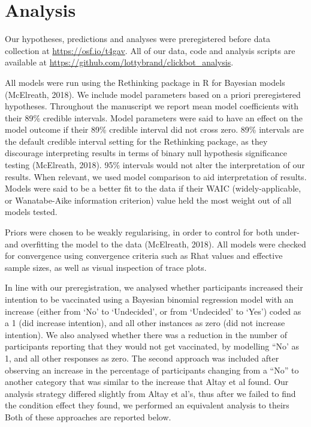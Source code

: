 \documentclass[
  english,
  ,jou,floatsintext]{apa6}
\begin{document}
\hypertarget{analysis}{%
\section{Analysis}\label{analysis}}

Our hypotheses, predictions and analyses were preregistered before data collection at \url{https://osf.io/t4gav}. All of our data, code and analysis scripts are available at \url{https://github.com/lottybrand/clickbot_analysis}.

All models were run using the Rethinking package in R for Bayesian models (McElreath, 2018). We include model parameters based on a priori preregistered hypotheses. Throughout the manuscript we report mean model coefficients with their 89\% credible intervals. Model parameters were said to have an effect on the model outcome if their 89\% credible interval did not cross zero. 89\% intervals are the default credible interval setting for the Rethinking package, as they discourage interpreting results in terms of binary null hypothesis significance testing (McElreath, 2018). 95\% intervals would not alter the interpretation of our results. When relevant, we used model comparison to aid interpretation of results. Models were said to be a better fit to the data if their WAIC (widely-applicable, or Wanatabe-Aike information criterion) value held the most weight out of all models tested.

Priors were chosen to be weakly regularising, in order to control for both under- and overfitting the model to the data (McElreath, 2018). All models were checked for convergence using convergence criteria such as Rhat values and effective sample sizes, as well as visual inspection of trace plots.

In line with our preregistration, we analysed whether participants increased their intention to be vaccinated using a Bayesian binomial regression model with an increase (either from `No' to `Undecided', or from `Undecided' to `Yes') coded as a 1 (did increase intention), and all other instances as zero (did not increase intention). We also analysed whether there was a reduction in the number of participants reporting that they would not get vaccinated, by modelling ``No' as 1, and all other responses as zero. The second approach was included after observing an increase in the percentage of participants changing from a ``No'' to another category that was similar to the increase that Altay et al found. Our analysis strategy differed slightly from Altay et al's, thus after we failed to find the condition effect they found, we performed an equivalent analysis to theirs Both of these approaches are reported below.
\end{document}
